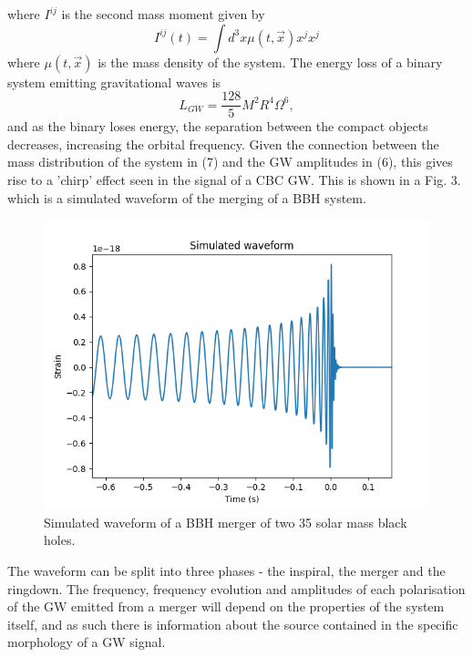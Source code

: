 \documentclass[11pt]{article}
\begin{document}
where $I^{ij}$ is the second mass moment given by
\begin{equation}
I^{ij}(t)=\int d^3x\mu(t,\vec{x})x^jx^j
\end{equation}
where $\mu(t,\vec{x})$ is the mass density of the system. The energy loss of a binary system emitting gravitational waves is
\begin{equation}
L_{GW}=\frac{128}{5}M^2R^4\Omega^6,
\end{equation}
and as the binary loses energy, the separation between the compact objects decreases, increasing the orbital frequency. Given the connection between the mass distribution of the system in (7) and the GW amplitudes in (6), this gives rise to a 'chirp' effect seen in the signal of a CBC GW. This is shown in a Fig. 3. which is a simulated waveform of the merging of a BBH system.

\begin{figure}
	\includegraphics[scale=0.60]{fig3.png}
	\centering
	\caption{Simulated waveform of a BBH merger of two 35 solar mass black holes.}
	\centering
\end{figure}

The waveform can be split into three phases - the inspiral, the merger and the ringdown. The frequency, frequency evolution and amplitudes of each polarisation of the GW emitted from a merger will depend on the properties of the system itself, and as such there is information about the source contained in the specific morphology of a GW signal.
\end{document}
